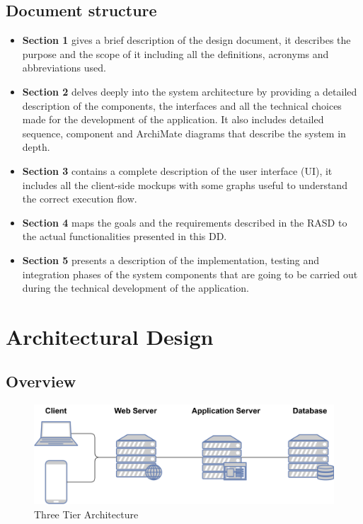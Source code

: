 \documentclass[table, 12pt]{article}
\begin{document}
\subsection{Document structure}
\begin{itemize}
    \item \textbf{Section 1} gives a brief description of the design document, it describes the purpose and the scope of it including all the definitions, acronyms and abbreviations used. 
    \item \textbf{Section 2} delves deeply into the system architecture by providing a detailed description of the components, the interfaces and all the technical choices made for the development of the application.
    It also includes detailed sequence, component and ArchiMate diagrams that describe the system in depth.
    \item \textbf{Section 3} contains a complete description of the user interface (UI), it includes all the client-side mockups with some graphs useful to understand the correct execution flow.
    \item \textbf{Section 4} maps the goals and the requirements described in the RASD to the actual functionalities presented in this DD.
    \item \textbf{Section 5} presents a description of the implementation, testing and integration phases of the system components that are going to be carried out during the technical development of the application.
\end{itemize}

\newpage

\section{Architectural Design}

\subsection{Overview}
\begin{center}
    \begin{figure}[H]
        \includegraphics[scale=0.80, center]{assets/3-tier-architecture.png}
        \caption{Three Tier Architecture}
        \label{fig: three_tier_architecture}
    \end{figure}
\end{center}
\end{document}
